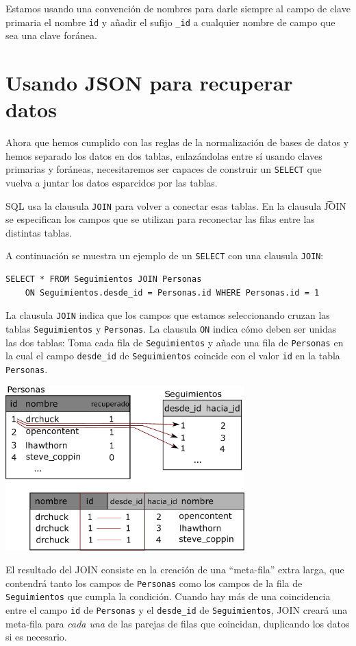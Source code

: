 Estamos usando una
convención de nombres para darle siempre al campo de clave primaria el nombre
{\tt id} y añadir el sufijo \verb"_id" a cualquier nombre de campo
que sea una clave foránea.

\section{Usando JSON para recuperar datos}

Ahora que hemos cumplido con las reglas de la normalización de bases de datos
y hemos separado los datos en dos tablas, enlazándolas entre sí usando
claves primarias y foráneas, necesitaremos ser capaces de construir un
{\tt SELECT} que vuelva a juntar los datos esparcidos por las tablas.

SQL usa la clausula {\tt JOIN} para volver a conectar esas tablas.
En la clausula {\t JOIN} se especifican los campos que se utilizan
para reconectar las filas entre las distintas tablas.

A continuación se muestra un ejemplo de un {\tt SELECT} con una
clausula {\tt JOIN}:

\beforeverb
\begin{verbatim}
SELECT * FROM Seguimientos JOIN Personas 
    ON Seguimientos.desde_id = Personas.id WHERE Personas.id = 1
\end{verbatim}
\afterverb
%
La clausula {\tt JOIN} indica que los campos que estamos seleccionando
cruzan las tablas {\tt Seguimientos} y {\tt Personas}. La clausula
{\tt ON} indica cómo deben ser unidas las dos tablas: Toma cada fila
de {\tt Seguimientos} y añade una fila de {\tt Personas} en la cual el
campo \verb"desde_id" de {\tt Seguimientos} coincide con el valor {\tt id}
en la tabla {\tt Personas}.

\beforefig
\centerline{\includegraphics[height=2.50in]{figs2/join.eps}}
\afterfig

El resultado del JOIN consiste en la creación de una ``meta-fila'' extra larga, que contendrá
tanto los campos de {\tt Personas} como los campos de la fila de {\tt Seguimientos} que cumpla la
condición.
Cuando hay más de una coincidencia entre el campo {\tt id} de {\tt Personas}
y el \verb"desde_id" de {\tt Seguimientos}, JOIN creará una meta-fila
para \emph{cada una} de las parejas de filas que coincidan, duplicando los datos si es necesario.

